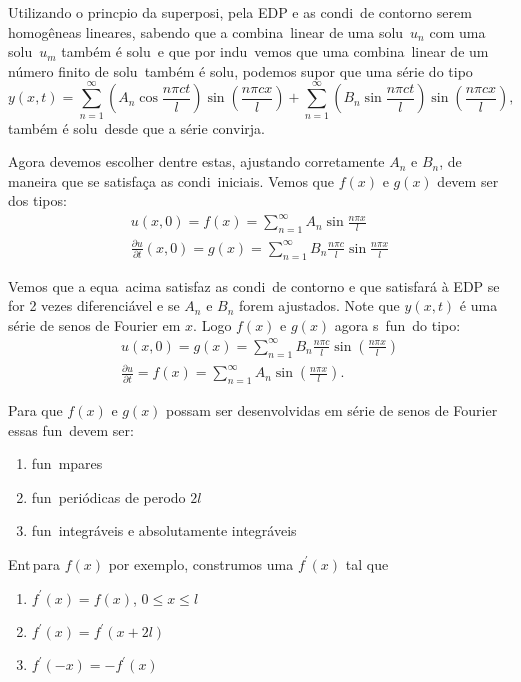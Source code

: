 Utilizando o princ\ih pio da superposi\cao, pela EDP e as
condi\coes\ de contorno serem homog\^ eneas lineares, sabendo que
a combina\cao\ linear de uma solu\cao\ $u_{n}$ com uma solu\cao\
$u_{m}$ tamb\'em \'e solu\cao\, e que por indu\cao\ vemos que uma
combina\cao\ linear de um n\'umero finito de solu\coes\ tamb\'em
\'e solu\cao, podemos supor que uma s\'erie do tipo
\[y(x,t) = \sum_{n=1}^{\infty}(A_{n}\cos \frac{n\pi ct}{l})\sin (\frac{n\pi
cx}{l}) + \sum_{n=1}^{\infty}(B_{n}\sin \frac{n\pi ct}{l})\sin (\frac{n\pi
cx}{l}),\]
tamb\'em \'e solu\cao\ desde que a s\'erie convirja.

Agora devemos escolher dentre estas, ajustando
corretamente $A_{n}$ e $B_{n}$, de maneira que se satisfa\c ca as
condi\coes\ iniciais. Vemos que $f(x)$ e $g(x)$ devem ser dos tipos:
\begin{eqnarray*}
u(x,0) = f(x) = \sum_{n=1}^{\infty}A_{n}\sin \frac{n\pi x}{l} \\
\frac{\partial u}{\partial t}(x,0) = g(x) = \sum_{n=1}^{\infty}B_{n}\frac{n\pi c}{l}\sin \frac{n\pi x}{l} 
\end{eqnarray*}

Vemos que a equa\cao\ acima satisfaz as condi\coes\ de contorno e que
satisfar\'a \`a EDP se for 2 vezes diferenci\'avel e se $A_{n}$
e $B_{n}$ forem ajustados. Note que $y(x,t)$ \'e uma s\'erie de senos de
Fourier em $x$. Logo $f(x)$ e $g(x)$ agora s\ao\ fun\coes\ do
tipo:
\begin{eqnarray*}
u(x,0) = g(x) = \sum_{n=1}^{\infty}B_{n}\frac{n\pi c}{l}\sin (\frac{n\pi x}{l}) \\
\frac{\partial u}{\partial t} = f(x) = \sum_{n=1}^{\infty}A_{n}\sin (\frac{n\pi x}{l}).
\end{eqnarray*}

Para que $f(x)$ e $g(x)$ possam ser desenvolvidas em s\'erie de senos de Fourier essas fun\coes\ devem ser:
\begin{enumerate}
\item fun\coes\ \ih mpares
\item fun\coes\ peri\'odicas de per\ih odo $2l$
\item fun\coes\ integr\'aveis e absolutamente integr\'aveis
\end{enumerate}
Ent\ao\,para $f(x)$ por exemplo, constru\ih mos uma $f^{'}(x)$ tal que
\begin{enumerate}
\item $f^{'}(x) = f(x)$, $0 \leq x \leq l$
\item $f^{'}(x) = f^{'}(x + 2l)$
\item $f^{'}(-x) = -f^{'}(x)$
\end{enumerate}


